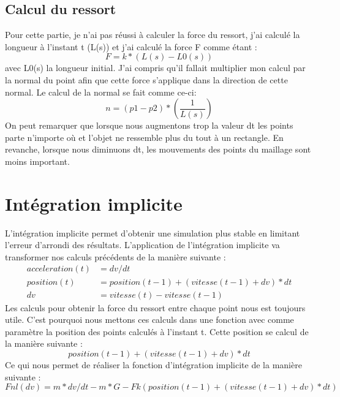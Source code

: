 \documentclass[a4paper,11pt]{article}
\begin{document}
\subsection{Calcul du ressort}
Pour cette partie, je n'ai pas réussi à calculer la force du ressort, j'ai calculé la longueur 
à l'instant t (L(s)) et j'ai calculé la force F comme étant :
\begin{equation}
F = k*(L(s)-L0(s))
\end{equation}
avec L0(s) la longueur initial.
J'ai compris qu'il fallait multiplier mon calcul par la normal du point afin que cette force
s'applique dans la direction de cette normal. Le calcul de la normal se fait comme ce-ci:
\begin{equation}
n = (p1 - p2) * (\frac{1}{L(s)})
\end{equation}
On peut remarquer que lorsque nous augmentons trop la valeur dt les points parte n'importe où
et l'objet ne ressemble plus du tout à un rectangle. En revanche, lorsque nous diminuons dt,
les mouvements des points du maillage sont moins important.

\section{Intégration implicite}
L'intégration implicite permet d'obtenir une simulation plus stable en limitant l'erreur d'arrondi
des résultats. L'application de l'intégration implicite va transformer nos calculs précédents de 
la manière suivante :
\begin{align}
  acceleration(t) &= dv / dt\\
  position(t) &= position(t-1) + (vitesse(t-1) + dv) * dt\\
  dv &= vitesse(t) - vitesse(t-1) 
\end{align}
Les calculs pour obtenir la force du ressort entre chaque point nous est toujours utile. C'est pourquoi
nous mettons ces calculs dans une fonction avec comme paramètre la position des points calculés à l'instant t.
Cette position se calcul de la manière suivante :
\begin{equation}
  position(t-1) + (vitesse(t-1) + dv)*dt
\end{equation}
Ce qui nous permet de réaliser la fonction d'intégration implicite de la manière suivante :
\begin{equation}
  Fnl(dv) = m * dv/dt - m*G - Fk(position(t-1) + (vitesse(t-1) + dv)*dt)
\end{equation}
\end{document}
